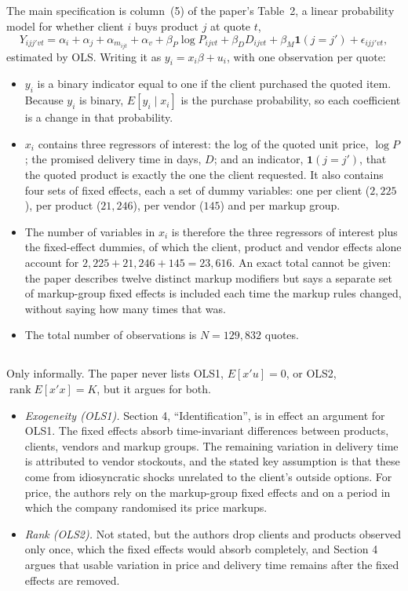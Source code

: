 \documentclass[11pt]{article}
\begin{document}
\subsection{}
The main specification is column~(5) of the paper's Table~2, a linear
probability model for whether client $i$ buys product $j$ at quote $t$,
\[
Y_{ijj'vt} = \alpha_i + \alpha_j + \alpha_{m_{ijt}} + \alpha_v
 + \beta_P \log P_{ijvt} + \beta_D D_{ijvt}
 + \beta_M \mathbf{1}(j = j') + \epsilon_{ijj'vt},
\]
estimated by OLS. Writing it as $y_i = x_i\beta + u_i$, with one observation
per quote:
\begin{itemize}
\item $y_i$ is a binary indicator equal to one if the client purchased the
quoted item. Because $y_i$ is binary, $E[y_i \mid x_i]$ is the purchase
probability, so each coefficient is a change in that probability.
\item $x_i$ contains three regressors of interest: the log of the quoted unit
price, $\log P$; the promised delivery time in days, $D$; and an indicator,
$\mathbf{1}(j = j')$, that the quoted product is exactly the one the client
requested. It also contains four sets of fixed effects, each a set of dummy
variables: one per client ($2{,}225$), per product ($21{,}246$), per vendor
($145$) and per markup group.
\item The number of variables in $x_i$ is therefore the three regressors of
interest plus the fixed-effect dummies, of which the client, product and
vendor effects alone account for $2{,}225 + 21{,}246 + 145 = 23{,}616$. An
exact total cannot be given: the paper describes twelve distinct markup
modifiers but says a separate set of markup-group fixed effects is included
each time the markup rules changed, without saying how many times that was.
\item The total number of observations is $N = 129{,}832$ quotes.
\end{itemize}

\subsection{}
Only informally. The paper never lists OLS1, $E[x'u] = 0$, or OLS2,
$\operatorname{rank} E[x'x] = K$, but it argues for both.

\begin{itemize}
\item \emph{Exogeneity (OLS1).} Section 4, ``Identification'', is in effect an
argument for OLS1. The fixed effects absorb time-invariant differences between
products, clients, vendors and markup groups. The remaining variation in
delivery time is attributed to vendor stockouts, and the stated key assumption
is that these come from idiosyncratic shocks unrelated to the client's outside
options. For price, the authors rely on the markup-group fixed effects and on a
period in which the company randomised its price markups.
\item \emph{Rank (OLS2).} Not stated, but the authors drop clients and products
observed only once, which the fixed effects would absorb completely, and
Section 4 argues that usable variation in price and delivery time remains
after the fixed effects are removed.
\end{itemize}
\end{document}
